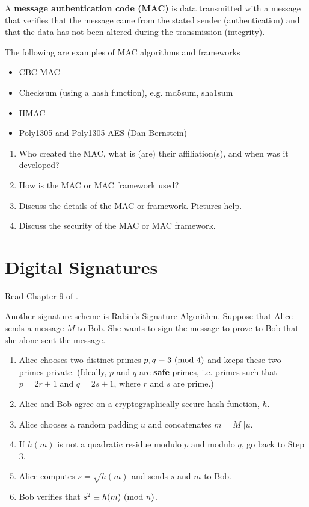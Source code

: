\begin{definition}
A {\bf message authentication code (MAC)} is data transmitted with a message that verifies that the message came from the stated sender (authentication) and that the data has not been altered during the transmission (integrity).
\end{definition}

	The following are examples of MAC algorithms and frameworks
	\begin{itemize}
		\item CBC-MAC
		\item Checksum (using a hash function), e.g. md5sum, sha1sum
		\item HMAC
		\item Poly1305 and Poly1305-AES (Dan Bernstein)
	\end{itemize}


\begin{problem}  [15 points]

	\begin{enumerate}
		\item Who created the MAC, what is (are) their affiliation(s), and when was it developed?
		\item How is the MAC or MAC framework used?
		\item Discuss the details of the MAC or framework. Pictures help.
		\item Discuss the security of the MAC or MAC framework.
	\end{enumerate}
\end{problem}


	\section{Digital Signatures}

	Read Chapter 9 of \cite{tw}.

	Another signature scheme is Rabin's Signature Algorithm. Suppose that Alice sends a message $M$ to Bob. She wants to sign the message to prove to Bob that she alone sent the message.

	\begin{enumerate}
		\item Alice chooses two distinct primes $p,q\equiv 3\mbox{\ $\left(\mathrm{mod}\ {4}\right)$}$ and keeps these two primes private. (Ideally, $p$ and $q$ are {\bf safe} primes, i.e. primes such that $p=2r+1$ and $q = 2s+1$, where $r$ and $s$ are prime.)
		\item Alice and Bob agree on a cryptographically secure hash function, $h$.
		\item Alice chooses a random padding $u$ and concatenates $m=M||u$.
		\item If $h(m)$ is not a quadratic residue modulo $p$ and modulo $q$, go back to Step 3.
		\item Alice computes $s = \sqrt{h(m)}$ and sends $s$ and $m$ to Bob.
		\item Bob verifies that $s^2 \equiv h(m) \mbox{\ $\left(\mathrm{mod}\ {n}\right)$}$.
	\end{enumerate}



